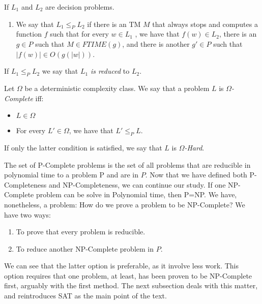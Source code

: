 

\begin{definition}
  If $L_1$ and $L_2$ are decision problems.
\begin{enumerate}
\item We say that $L_1 \le_P L_2$ if there is an TM $M$ that always stops and computes a function $f$ such that for every $w \in L_1$ , we have that $f(w) \in L_2$, there is an $g\in P$ such that $M \in FTIME(g)$, and there is another $g'\in P$ such that $|f(w)| \in O(g(|w|))$.
\end{enumerate}
If $L_1 \le_{P} L_2$ we say that $L_1$ \emph{is reduced} to $L_2$.
\end{definition}




\begin{definition}
  Let $\Omega$ be a deterministic complexity class.  We say that a problem $L$ is $\Omega$\emph{-Complete} iff:
  \begin{itemize}
  \item $L \in\Omega$
  \item For every $L' \in \Omega$, we have that $L' \le_P L$.
  \end{itemize}

If only the latter condition is satisfied, we say that $L$ is $\Omega$\emph{-Hard}.

\end{definition}


The set of P-Complete problems is the set of all problems that are reducible in polynomial time to a problem P and are in $P$. Now that we have defined both P-Completeness and NP-Completeness, we can continue our study. If one NP-Complete problem can be solve in Polynomial time, then P=NP. We have, nonetheless, a problem: How do we prove a problem to be NP-Complete? We have two ways:
\begin{enumerate}
\item To prove that every problem is reducible.
\item To reduce another NP-Complete problem in $P$.
\end{enumerate}

We can see that the latter option is preferable, as it involve less work. This option requires that one problem, at least, has been proven to be NP-Complete first, arguably with the first method. The next subsection deals with this matter, and reintroduces SAT as the main point of the text. 


